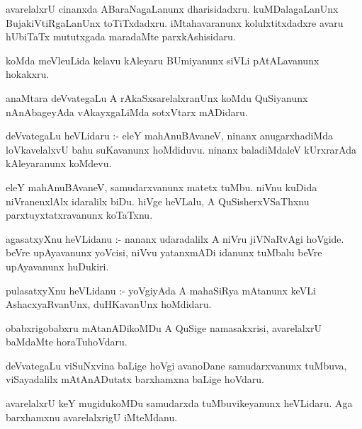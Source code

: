 \documentclass{article}
\begin{document}
\begin{mn}
avarelalxrU  cinanxda  ABaraNagaLanunx  dharisidadxru.  kuMDalagaLanUnx  
BujakiVtiRgaLanUnx  toTiTxdadxru.  iMtahavaranunx  kolulxtitxdadxre  avaru  
hUbiTaTx  mututxgada  maradaMte  parxkAshisidaru.
\end{mn}

\begin{mn}
koMda  meVleuLida  kelavu  kAleyaru  BUmiyanunx  siVLi  pAtALavanunx  hokakxru.
\end{mn}

\begin{mn}
anaMtara  deVvategaLu  A  rAkaSxsarelalxranUnx  koMdu  QuSiyanunx  nAnAbageyAda  
vAkayxgaLiMda  sotxVtarx mADidaru.
\end{mn}

\begin{mn}
deVvategaLu  heVLidaru :- eleY  mahAnuBAvaneV,  ninanx  anugarxhadiMda  loVkavelalxvU  
bahu  suKavanunx  hoMdiduvu.  ninanx  baladiMdaleV  kUrxrarAda  kAleyaranunx  koMdevu.
\end{mn}

\begin{mn}
eleY  mahAnuBAvaneV,  samudarxvanunx  matetx  tuMbu.  niVnu  kuDida  niVranenxlAlx  
idaralilx  biDu.  hiVge  heVLalu,  A  QuSisherxVSaThxnu  parxtuyxtatxravanunx  koTaTxnu.
\end{mn}

\begin{mn}
agasatxyXnu  heVLidanu :- nananx  udaradalilx  A  niVru  jiVNaRvAgi hoVgide.  beVre  
upAyavanunx  yoVcisi,  niVvu  yatanxmADi  idanunx  tuMbalu  beVre  upAyavanunx  huDukiri.
\end{mn}

\begin{mn}
pulasatxyXnu  heVLidanu :- yoVgiyAda  A  mahaSiRya  mAtanunx  keVLi  AshacxyaRvanUnx,  
duHKavanUnx  hoMdidaru.
\end{mn}

\begin{mn}
obabxrigobabxru  mAtanADikoMDu  A  QuSige  namasakxrisi,  avarelalxrU  baMdaMte  horaTuhoVdaru. 
\end{mn}

\begin{mn}
deVvategaLu  viSuNxvina  baLige  hoVgi  avanoDane  samudarxvanunx  tuMbuva,  
viSayadalilx  mAtAnADutatx  barxhamxna  baLige  hoVdaru.
\end{mn}

\begin{mn}
avarelalxrU  keY mugidukoMDu  samudarxda  tuMbuvikeyanunx  heVLidaru.  Aga  
barxhamxnu  avarelalxrigU  iMteMdanu.
\end{mn}
\end{document}
